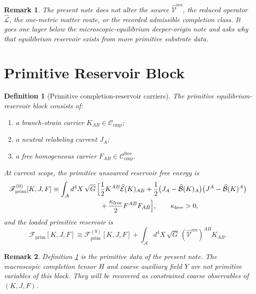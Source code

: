 \documentclass[11pt]{article}
\newcommand{\Sub}{\mathcal A}
\newcommand{\ResidualLift}{\widehat{\mathcal V}^{\mathrm{res}}}
\newcommand{\SubEinLin}{\widehat{\mathcal E}}
\newcommand{\SubGaugeVec}{\widehat{\mathcal B}}
\newcommand{\SubReducedEin}{\widehat{\mathcal L}}
\newcommand{\GaugeAux}{Y}
\newcommand{\CompClass}{\mathscr C_{\mathrm{cmp}}}
\newcommand{\CompFree}{\mathscr C_{\mathrm{cmp}}^{\mathrm{free}}}
\newcommand{\PrimFunctional}{\mathscr F_{\mathrm{prim}}}
\newcommand{\FreeStiff}{\kappa_{\mathrm{free}}}
\newcommand{\PrimStrain}{K}
\newcommand{\PrimNeutral}{J}
\newcommand{\PrimFree}{F}
\newtheorem{definition}{Definition}
\newtheorem{remark}{Remark}
\begin{document}
\begin{remark}
The present note does not alter the source \(\ResidualLift\), the reduced operator \(\SubReducedEin\), the one-metric matter route, or the recorded admissible completion class. It goes one layer below the microscopic-equilibrium deeper-origin note and asks why that equilibrium reservoir exists from more primitive substrate data.
\end{remark}

\section{Primitive Reservoir Block}

\begin{definition}[Primitive completion-reservoir carriers]
\label{def:primitive}
The \emph{primitive equilibrium-reservoir block} consists of:
\begin{enumerate}
    \item a branch-strain carrier \(\PrimStrain_{AB}\in\CompClass\);
    \item a neutral relabeling current \(\PrimNeutral_A\);
    \item a free homogeneous carrier \(\PrimFree_{AB}\in\CompFree\).
\end{enumerate}
At current scope, the primitive unsourced reservoir free energy is
\begin{equation}
\begin{aligned}
\PrimFunctional^{(0)}[\PrimStrain,\PrimNeutral,\PrimFree]
\equiv
\int_{\Sub} d^4X\,\sqrt{G}\,
\Bigl[
&\frac12 \PrimStrain^{AB}\SubEinLin(\PrimStrain)_{AB}
+\frac12\bigl(\PrimNeutral_A-\SubGaugeVec(\PrimStrain)_A\bigr)
\bigl(\PrimNeutral^A-\SubGaugeVec(\PrimStrain)^A\bigr)
\\
&+\frac{\FreeStiff}{2}\PrimFree^{AB}\PrimFree_{AB}
\Bigr],
\qquad
\FreeStiff>0,
\end{aligned}
\label{eq:prim0}
\end{equation}
and the loaded primitive reservoir is
\begin{equation}
\PrimFunctional[\PrimStrain,\PrimNeutral,\PrimFree]
\equiv
\PrimFunctional^{(0)}[\PrimStrain,\PrimNeutral,\PrimFree]
+
\int_{\Sub} d^4X\,\sqrt{G}\,
(\ResidualLift)^{AB}\PrimStrain_{AB}.
\label{eq:prim}
\end{equation}
\end{definition}

\begin{remark}
Definition \ref{def:primitive} is the primitive data of the present note. The macroscopic completion tensor \(H\) and coarse auxiliary field \(\GaugeAux\) are \emph{not} primitive variables of this block. They will be recovered as constrained coarse observables of \((\PrimStrain,\PrimNeutral,\PrimFree)\).
\end{remark}
\end{document}
